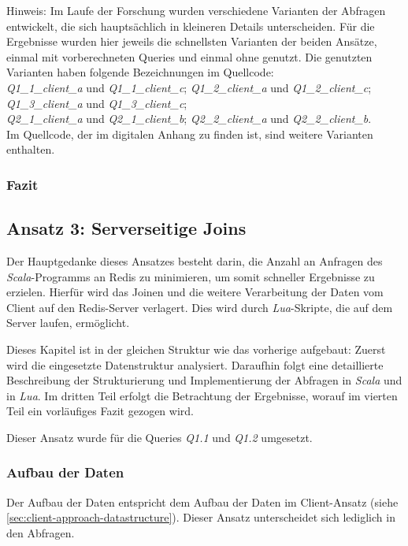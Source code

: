 Hinweis: Im Laufe der Forschung wurden verschiedene Varianten der Abfragen entwickelt, die sich hauptsächlich in kleineren Details unterscheiden. Für die Ergebnisse wurden hier jeweils die schnellsten Varianten der beiden Ansätze, einmal mit vorberechneten Queries und einmal ohne genutzt. Die genutzten Varianten haben folgende Bezeichnungen im Quellcode:\\
\emph{Q1\_1\_client\_a} und \emph{Q1\_1\_client\_c}; \emph{Q1\_2\_client\_a} und \emph{Q1\_2\_client\_c};\\ \emph{Q1\_3\_client\_a} und \emph{Q1\_3\_client\_c};\\ \emph{Q2\_1\_client\_a} und \emph{Q2\_1\_client\_b}; \emph{Q2\_2\_client\_a} und \emph{Q2\_2\_client\_b}.
\\Im Quellcode, der im digitalen Anhang zu finden ist, sind weitere Varianten enthalten. %


\subsubsection{Fazit}




\subsection{Ansatz 3: Serverseitige Joins}
Der Hauptgedanke dieses Ansatzes besteht darin, die Anzahl an Anfragen des \emph{Scala}-Programms an Redis zu minimieren, um somit schneller Ergebnisse zu erzielen.
Hierfür wird das Joinen und die weitere Verarbeitung der Daten vom Client auf den Redis-Server verlagert. Dies wird durch \emph{Lua}-Skripte, die auf dem Server laufen, ermöglicht.

Dieses Kapitel ist in der gleichen Struktur wie das vorherige aufgebaut:
Zuerst wird die eingesetzte Datenstruktur analysiert. Daraufhin folgt eine detaillierte Beschreibung der Strukturierung und Implementierung der Abfragen in \emph{Scala} und in \emph{Lua}. Im dritten Teil erfolgt die Betrachtung der Ergebnisse, worauf im vierten Teil ein vorläufiges Fazit gezogen wird.

Dieser Ansatz wurde für die Queries \emph{Q1.1} und \emph{Q1.2} umgesetzt.

\subsubsection{Aufbau der Daten}
Der Aufbau der Daten entspricht dem Aufbau der Daten im Client-Ansatz (siehe \cref{sec:client-approach-datastructure}). Dieser Ansatz unterscheidet sich lediglich in den Abfragen.

